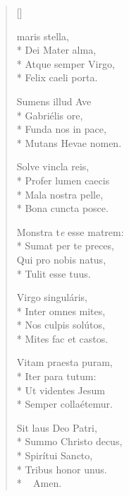 \newHymn



\settowidth{\versewidth}{Ave maris stella..}

\begin{multicols}{2}
\begin{verse}[\versewidth]

 maris stella, \\*
Dei Mater alma,   \\*      
Atque semper Virgo, \\*    
Felix caeli porta.      
\pointtrans

Sumens illud Ave        \\*
Gabriélis ore,          \\*
Funda nos in pace,      \\*
Mutans Hevae nomen.     

Solve vincla reis,     \\*
Profer lumen caecis     \\*
Mala nostra pelle,      \\*
Bona cuncta posce.      

Monstra t\textit{e} esse matrem: \\*
Sumat per te preces,    \\
Qui pro nobis natus,    \\*
Tulit esse tuus.        
                 

Virgo singuláris,       \\*
Inter omnes mites,      \\*
Nos culpis solútos,     \\*
Mites fac et castos.    

Vitam praesta puram,    \\*
Iter para tutum:        \\*
Ut videntes Jesum       \\*
Semper collaétemur.     

Sit laus Deo Patri,     \\*
Summo Christo decus,    \\*
Spirítui Sancto,        \\*
Tribus honor unus.\\*
 ~ \quad Amen.

\end{verse}
\end{multicols}


